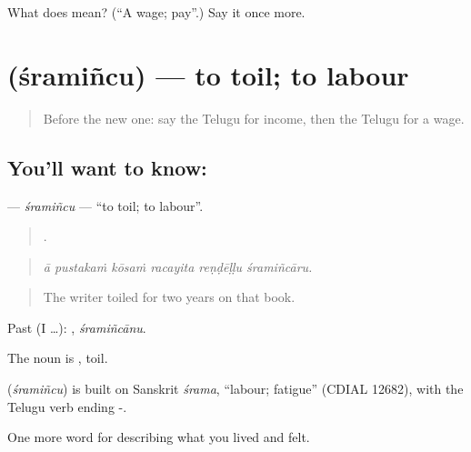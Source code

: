 \begin{tcolorbox}[breakable,colback=teal!4,colframe=teal!35!black,title={Before you move on}]
What does  mean? (\textquotedblleft{}A wage; pay\textquotedblright{}.) Say it once more.
\end{tcolorbox}
\section[\texorpdfstring{\te{శ్రమించు} (śramiñcu)}{శ్రమించు (śramiñcu)}]{ (śramiñcu) — to toil; to labour}

\label{lesson:TE-C525-sramincu}



\begin{quote}
Before the new one: say the Telugu for income, then the Telugu for a wage.
\end{quote}

\subsection*{You'll want to know: }
\textbf{} — \emph{śramiñcu} — \textquotedblleft{}to toil; to labour\textquotedblright{}.

\begin{quote}
     .
\end{quote}

\begin{quote}
\emph{ā pustakaṁ kōsaṁ racayita reṇḍēḷḷu śramiñcāru.}
\end{quote}

\begin{quote}
The writer toiled for two years on that book.
\end{quote}

Past (I …): , \emph{śramiñcānu}.

The noun is , toil.

\begin{cousinweb}
\textbf{} (\emph{śramiñcu}) is built on Sanskrit \emph{śrama}, \textquotedblleft{}labour; fatigue\textquotedblright{} (CDIAL 12682), with the Telugu verb ending -.
\end{cousinweb}

\begin{grammarlens}[title={What you've built}]
One more word for describing what you lived and felt.
\end{grammarlens}


